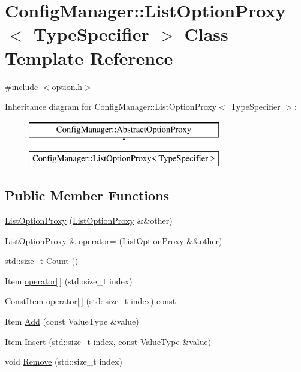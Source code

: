 \hypertarget{class_config_manager_1_1_list_option_proxy}{}\section{Config\+Manager\+:\+:List\+Option\+Proxy$<$ Type\+Specifier $>$ Class Template Reference}
\label{class_config_manager_1_1_list_option_proxy}


{\ttfamily \#include $<$option.\+h$>$}

Inheritance diagram for Config\+Manager\+:\+:List\+Option\+Proxy$<$ Type\+Specifier $>$\+:\begin{figure}[H]
\begin{center}
\leavevmode
\includegraphics[height=2.000000cm]{class_config_manager_1_1_list_option_proxy}
\end{center}
\end{figure}
\subsection*{Public Member Functions}
\begin{DoxyCompactItemize}
\item 
\hyperlink{class_config_manager_1_1_list_option_proxy_ac277cb155b195258afe342f9efbffa7f}{List\+Option\+Proxy} (\hyperlink{class_config_manager_1_1_list_option_proxy}{List\+Option\+Proxy} \&\&other)
\item 
\hyperlink{class_config_manager_1_1_list_option_proxy}{List\+Option\+Proxy} \& \hyperlink{class_config_manager_1_1_list_option_proxy_a82c849b719e344486e0ef8c55afd28bc}{operator=} (\hyperlink{class_config_manager_1_1_list_option_proxy}{List\+Option\+Proxy} \&\&other)
\item 
std\+::size\+\_\+t \hyperlink{class_config_manager_1_1_list_option_proxy_a0abae5b24d1e43954b5d8c3d4ec942cc}{Count} ()
\item 
Item \hyperlink{class_config_manager_1_1_list_option_proxy_ab340c79edbe0da96cec77d46e571c3f0}{operator\mbox{[}$\,$\mbox{]}} (std\+::size\+\_\+t index)
\item 
Const\+Item \hyperlink{class_config_manager_1_1_list_option_proxy_a44365650affc4e1a117a01a8bce23ccb}{operator\mbox{[}$\,$\mbox{]}} (std\+::size\+\_\+t index) const 
\item 
Item \hyperlink{class_config_manager_1_1_list_option_proxy_a5a5207680997e76687527280474f6785}{Add} (const Value\+Type \&value)
\item 
Item \hyperlink{class_config_manager_1_1_list_option_proxy_af72aa3e07f55d22f46fbd542c68f20c9}{Insert} (std\+::size\+\_\+t index, const Value\+Type \&value)
\item 
void \hyperlink{class_config_manager_1_1_list_option_proxy_adf4052cfbba12a60b02601b63a618ae6}{Remove} (std\+::size\+\_\+t index)
\end{DoxyCompactItemize}

